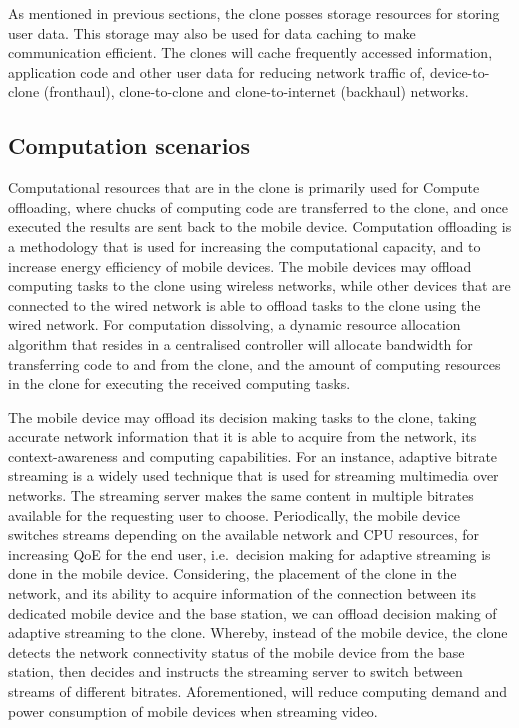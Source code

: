 \documentclass[12pt,journal,compsoc, onecolumn]{IEEEtran}
\begin{document}
As mentioned in previous sections, the clone posses storage resources for storing user data. This storage may also be used for data caching to make communication efficient. The clones will cache frequently accessed information, application code and other user data for reducing network traffic of, device-to-clone (fronthaul), clone-to-clone and clone-to-internet (backhaul) networks.

\subsection{Computation scenarios}

Computational resources that are in the clone is primarily used for Compute offloading, where chucks of computing code are transferred to the clone, and once executed the results are sent back to the mobile device. Computation offloading is a methodology that is used for increasing the computational capacity, and to increase energy efficiency of mobile devices. The mobile devices may offload computing tasks to the clone using wireless networks, while other devices that are connected to the wired network is able to offload tasks to the clone using the wired network. For computation dissolving, a dynamic resource allocation algorithm that resides in a centralised controller will allocate bandwidth for transferring code to and from the clone, and the amount of computing resources in the clone for executing the received computing tasks.

The mobile device may offload its decision making tasks to the clone, taking accurate network information that it is able to acquire from the network, its context-awareness and computing capabilities. For an instance, adaptive bitrate streaming is a widely used technique that is used for streaming multimedia over networks. The streaming server makes the same content in multiple bitrates available for the requesting user to choose. Periodically, the mobile device switches streams depending on the available network and CPU resources, for increasing QoE for the end user, i.e.\, decision making for adaptive streaming is done in the mobile device. Considering, the placement of the clone in the network, and its ability to acquire information of the connection between its dedicated mobile device and the base station, we can offload decision making of adaptive streaming to the clone. Whereby, instead of the mobile device, the clone detects the network connectivity status of the mobile device from the base station, then decides and instructs the streaming server to switch between streams of different bitrates. Aforementioned, will reduce computing demand and power consumption of mobile devices when streaming video.
\end{document}
